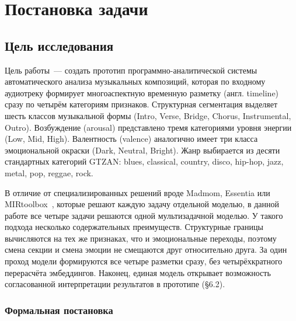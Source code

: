 \chapter{Постановка задачи}\label{ch:2}

\section{Цель исследования}\label{sec:2-1}

Цель работы~--- создать прототип программно-аналитической системы автоматического анализа музыкальных композиций, которая по входному аудиотреку формирует многоаспектную временную разметку (англ. timeline) сразу по четырём категориям признаков. Структурная сегментация выделяет шесть классов музыкальной формы (Intro, Verse, Bridge, Chorus, Instrumental, Outro). Возбуждение (arousal) представлено тремя категориями уровня энергии (Low, Mid, High). Валентность (valence) аналогично имеет три класса эмоциональной окраски (Dark, Neutral, Bright). Жанр выбирается из десяти стандартных категорий GTZAN: blues, classical, country, disco, hip-hop, jazz, metal, pop, reggae, rock.

В отличие от специализированных решений вроде Madmom, Essentia или MIRtoolbox~\cite{bock2016madmom,bogdanov2013essentia,lartillot2007mirtoolbox}, которые решают каждую задачу отдельной моделью, в данной работе все четыре задачи решаются одной мультизадачной моделью. У такого подхода несколько содержательных преимуществ. Структурные границы вычисляются на тех же признаках, что и эмоциональные переходы, поэтому смена секции и смена эмоции не смещаются друг относительно друга. За один проход модели формируются все четыре разметки сразу, без четырёхкратного перерасчёта эмбеддингов. Наконец, единая модель открывает возможность согласованной интерпретации результатов в прототипе (§6.2).

\subsection{Формальная постановка}

